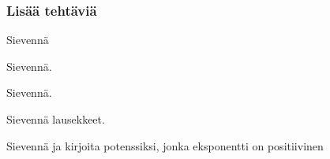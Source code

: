 \begin{tehtavasivu}
\subsubsection*{Lisää tehtäviä}

 \begin{tehtava}
        Sievennä

        \begin{vastaus}
        \end{vastaus}
    \end{tehtava}
    \begin{tehtava}
        Sievennä.
        \begin{vastaus}
        \end{vastaus}
    \end{tehtava}

    \begin{tehtava}
        Sievennä.
        \begin{vastaus}
        \end{vastaus}
    \end{tehtava}
      
    \begin{tehtava}
        Sievennä lausekkeet.
        \begin{vastaus}
        \end{vastaus}
    \end{tehtava}
    
    \begin{tehtava}
         Sievennä ja kirjoita potenssiksi, jonka eksponentti on positiivinen
        

\end{tehtava}
\end{tehtavasivu}
